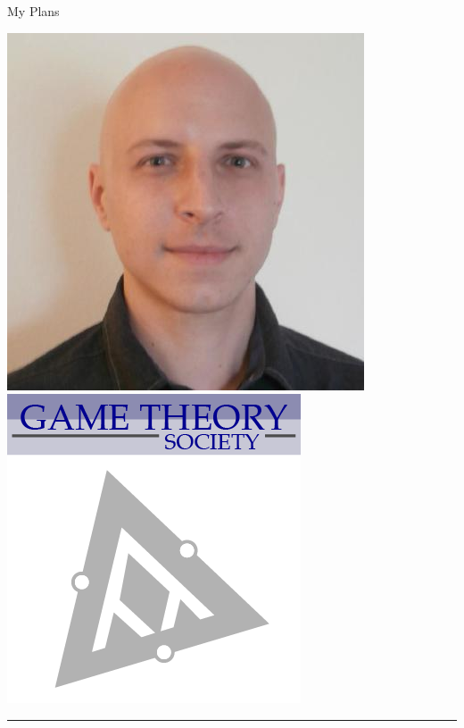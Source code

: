 \documentclass{beamer}
\begin{document}
\begin{frame}{My Plans}
\begin{center}
        \includegraphics[height=0.15\textheight]{static/marc.jpeg}
        \hspace{3cm}
        \includegraphics[height=0.2\textheight]{static/game-society.png}

        \rule{\textwidth}{2pt}
        \vspace{5pt}


\end{center}
\end{frame}
\end{document}
